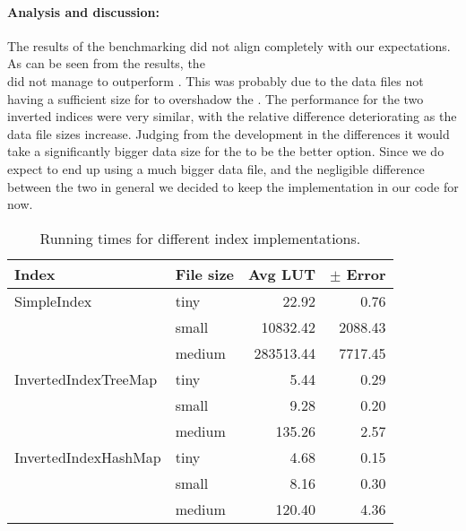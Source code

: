 \paragraph{Analysis and discussion:}
The results of the benchmarking did not align completely with our expectations. As can be seen from the results, the \\  did not manage to outperform . This was probably due to the data files not having a sufficient size for  to overshadow the . The performance for the two inverted indices were very similar, with the relative difference deteriorating as the data file sizes increase. Judging from the development in the differences it would take a significantly bigger data size for the  to be the better option. Since we do expect to end up using a much bigger data file, and the negligible difference between the two in general we decided to keep the  implementation in our code for now.

\begin{table}[t]
\centering
\begin{tabular}{llrr} \toprule
	Index					& File size & Avg LUT 	& $\pm$ Error \\ \midrule
	SimpleIndex				& tiny		& 22.92  	&	 0.76 \\ 
						 	& small		& 10832.42 	&	 2088.43 \\
							& medium 	& 283513.44 & 	 7717.45 \\ \hline
	InvertedIndexTreeMap	& tiny 		& 5.44 		& 	 0.29 \\
							& small 	& 9.28 		& 	 0.20  \\
							& medium 	& 135.26 	& 	 2.57 \\ \hline
	InvertedIndexHashMap	& tiny		& 4.68 		& 	 0.15 \\
							& small		& 8.16 		& 	 0.30 \\
							& medium 	& 120.40 	& 	 4.36 \\ \bottomrule
\end{tabular}
	\caption{Running times for different index implementations.}	
\label{tab:benchmark:indices}
\end{table} 	
